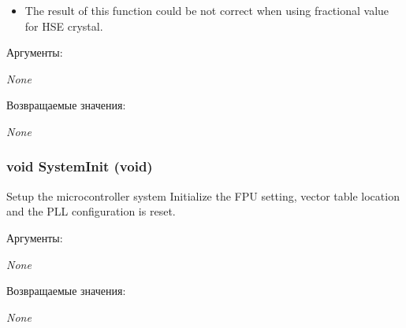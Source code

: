 \begin{itemize}
\item The result of this function could be not correct when using fractional value for HSE crystal.\end{itemize}


\begin{Desc}
\item[Аргументы:]
\begin{description}
\item[{\em None}]\end{description}
\end{Desc}
\begin{Desc}
\item[Возвращаемые значения:]
\begin{description}
\item[{\em None}]\end{description}
\end{Desc}
\hypertarget{group___s_t_m32_f3xx___system___private___functions_g93f514700ccf00d08dbdcff7f1224eb2}{
\subsubsection[{SystemInit}]{\setlength{\rightskip}{0pt plus 5cm}void SystemInit (void)}}
\label{group___s_t_m32_f3xx___system___private___functions_g93f514700ccf00d08dbdcff7f1224eb2}


Setup the microcontroller system Initialize the FPU setting, vector table location and the PLL configuration is reset. 

\begin{Desc}
\item[Аргументы:]
\begin{description}
\item[{\em None}]\end{description}
\end{Desc}
\begin{Desc}
\item[Возвращаемые значения:]
\begin{description}
\item[{\em None}]\end{description}
\end{Desc}
